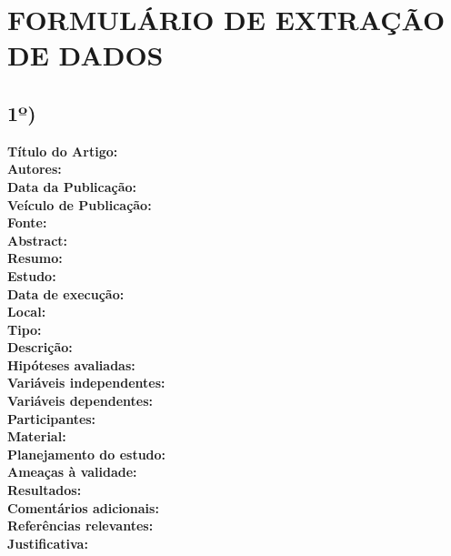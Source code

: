 \documentclass[12pt,a4paper]{article}
\begin{document}
\newpage
\section*{FORMULÁRIO DE EXTRAÇÃO DE DADOS}

\subsection*{1º)}
\noindent \textbf{Título do Artigo:} \hrulefill \\
\textbf{Autores:} \hrulefill \\
\textbf{Data da Publicação:} \hrulefill \\
\textbf{Veículo de Publicação:} \hrulefill \\
\textbf{Fonte:} \hrulefill \\
\textbf{Abstract:} \hrulefill \\
\textbf{Resumo:} \hrulefill \\
\textbf{Estudo:} \hrulefill \\
\textbf{Data de execução:} \hrulefill \\
\textbf{Local:} \hrulefill \\
\textbf{Tipo:} \hrulefill \\
\textbf{Descrição:} \hrulefill \\
\textbf{Hipóteses avaliadas:} \hrulefill \\
\textbf{Variáveis independentes:} \hrulefill \\
\textbf{Variáveis dependentes:} \hrulefill \\
\textbf{Participantes:} \hrulefill \\
\textbf{Material:} \hrulefill \\
\textbf{Planejamento do estudo:} \hrulefill \\
\textbf{Ameaças à validade:} \hrulefill \\
\textbf{Resultados:} \hrulefill \\
\textbf{Comentários adicionais:} \hrulefill \\
\textbf{Referências relevantes:} \hrulefill \\
\textbf{Justificativa:} \hrulefill

\vspace{1cm}
\end{document}
